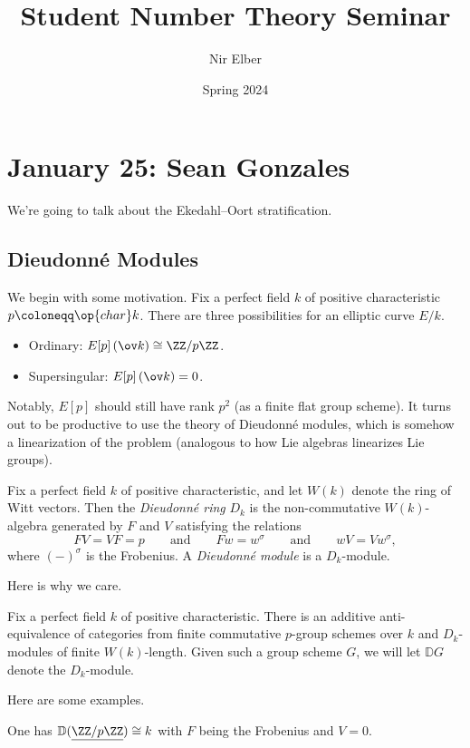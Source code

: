\documentclass{article}
\title{Student Number Theory Seminar}
\author{Nir Elber}
\date{Spring 2024}
\begin{document}
\maketitle

\tableofcontents

\section{January 25: Sean Gonzales}
We're going to talk about the Ekedahl--Oort stratification.

\subsection{Dieudonn\'e Modules}
We begin with some motivation. Fix a perfect field $k$ of positive characteristic $p\coloneqq\op{char}k$. There are three possibilities for an elliptic curve $E/k$.
\begin{itemize}
	\item Ordinary: $E[p]\left(\ov k\right)\cong\ZZ/p\ZZ$.
	\item Supersingular: $E[p]\left(\ov k\right)=0$.
\end{itemize}
Notably, $E[p]$ should still have rank $p^2$ (as a finite flat group scheme). It turns out to be productive to use the theory of Dieudonn\'e modules, which is somehow a linearization of the problem (analogous to how Lie algebras linearizes Lie groups).
\begin{definition}
	Fix a perfect field $k$ of positive characteristic, and let $W(k)$ denote the ring of Witt vectors. Then the \textit{Dieudonn\'e ring} $D_k$ is the non-commutative $W(k)$-algebra generated by $F$ and $V$ satisfying the relations
	\[FV=VF=p\qquad\text{and}\qquad Fw=w^\sigma\qquad\text{and}\qquad wV=Vw^\sigma,\]
	where $(-)^\sigma$ is the Frobenius. A \textit{Dieudonn\'e module} is a $D_k$-module.
\end{definition}
Here is why we care.
\begin{theorem}
	Fix a perfect field $k$ of positive characteristic. There is an additive anti-equivalence of categories from finite commutative $p$-group schemes over $k$ and $D_k$-modules of finite $W(k)$-length. Given such a group scheme $G$, we will let $\mathbb DG$ denote the $D_k$-module.
\end{theorem}
Here are some examples.
\begin{example}
	One has $\mathbb D(\underline{\ZZ/p\ZZ})\cong k$ with $F$ being the Frobenius and $V=0$.
\end{example}
\end{document}
